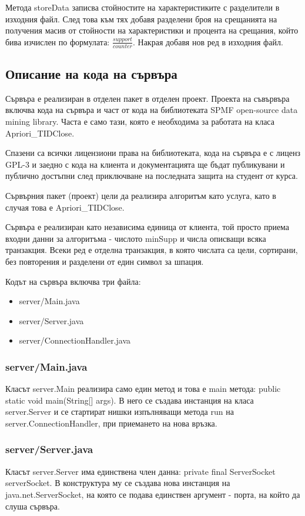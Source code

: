 \documentclass[a4paper, 12pt]{article}
\begin{document}
Метода storeData записва стойностите на характеристиките с разделители в изходния файл.
След това към тях добавя разделени броя на срещанията на получения масив от стойности на характеристики
и процента на срещания, който бива изчислен по формулата:  \(\displaystyle\frac{support}{counter}\).
Накрая добавя нов ред в изходния файл.

\subsection{Описание на кода на сървъра}
Сървъра е реализиран в отделен пакет в отделен проект.
Проекта на съвървъра включва кода на сървъра и част от кода на библиотеката SPMF open-source data mining library.
Часта е само тази, която е необходима за работата на класа Apriori\_TIDClose.

Спазени са всички лицензиони права на библиотеката,
кода на сървъра е с лиценз GPL-3 и заедно с кода на клиента и документацията
ще бъдат публикувани и публично достъпни след приключване на последната защита на студент от курса. 

Сървърния пакет (проект) цели да реализира алгоритъм като услуга, като в случая това е Apriori\_TIDClose.

Сървъра  е реализиран като независима единица от клиента,
той просто приема входни данни за алгоритъма - числото minSupp и числа описващи всяка транзакция.
Всеки ред е отделна транзакция, в която числата са цели, сортирани, без повторения и разделени от един символ за шпация. 

Кодът на сървъра включва три файла:
\begin{itemize}
\item server/Main.java
\item server/Server.java
\item server/ConnectionHandler.java
\end{itemize}

\subsubsection{server/Main.java}
Класът server.Main реализира само един метод и това е main метода: public static void main(String[] args).
В него се създава инстанция на класа server.Server и се стартират нишки изпълняващи метода run на server.ConnectionHandler,
при приемането на нова връзка.

\subsubsection{server/Server.java}
Класът server.Server има единствена член данна: private final ServerSocket serverSocket.
В конструктура му се създава нова инстанция на java.net.ServerSocket, на която се подава единствен аргумент - порта,
на който да слуша сървъра.
\end{document}
